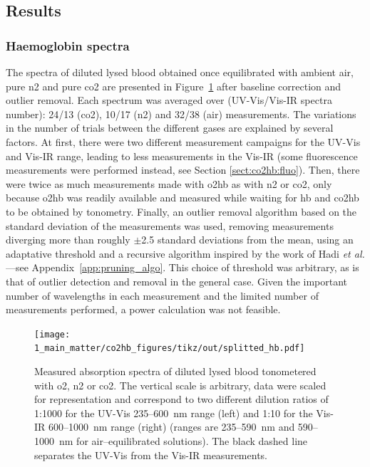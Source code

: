 \subsection{Results}

\subsubsection{Haemoglobin spectra}\label{sect:co2hb:hb_spectra}

The spectra of diluted lysed blood obtained once equilibrated with ambient air, pure \gls{n2} and pure \gls{co2} are presented in Figure~\ref{fig:co2hb:splitted_hb} after baseline correction and outlier removal. Each spectrum was averaged over (UV-Vis/Vis-IR spectra number): 24/13 (\gls{co2}), 10/17 (\gls{n2}) and 32/38 (air) measurements. The variations in the number of trials between the different gases are explained by several factors. At first, there were two different measurement campaigns for the UV-Vis and Vis-IR range, leading to less measurements in the Vis-IR (some fluorescence measurements were performed instead, see Section \ref{sect:co2hb:fluo}). Then, there were twice as much measurements made with {\gls{o2hb}} as with {\gls{n2}} or {\gls{co2}}, only because {\gls{o2hb}} was readily available and measured while waiting for {\gls{hb}} and {\gls{co2hb}} to be obtained by tonometry. Finally, an outlier removal algorithm based on the standard deviation of the measurements was used, removing measurements diverging more than roughly {$\pm$}2.5 standard deviations from the mean, using an adaptative threshold and a recursive algorithm inspired by the work of Hadi \textit{et al.}{\cite{hadi1992}}---see Appendix~\ref{app:pruning_algo}. This choice of threshold was arbitrary, as is that of outlier detection and removal in the general case{\cite{aguinis2013}}. Given the important number of wavelengths in each measurement and the limited number of measurements performed, a power calculation was not feasible.

\begin{figure}
	\centering
		\texttt{[image: 1\_main\_matter/co2hb\_figures/tikz/out/splitted\_hb.pdf]}
	\caption[Measured absorption spectra of diluted lysed blood tonometered with \gls{o2}, \gls{n2} or \gls{co2}]{Measured absorption spectra of diluted lysed blood tonometered with \gls{o2}, \gls{n2} or \gls{co2}. The vertical scale is arbitrary, data were scaled for representation and correspond to two different dilution ratios of 1:1000 for the UV-Vis 235--600~nm range (left) and 1:10 for the Vis-IR 600--1000~nm range (right) (ranges are 235--590~nm and 590--1000~nm for air--equilibrated solutions). The black dashed line separates the UV-Vis from the Vis-IR measurements.}
	\label{fig:co2hb:splitted_hb}
\end{figure}

